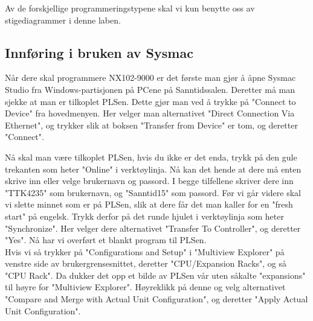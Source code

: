\begin{alphasection}
Av de forskjellige programmeringstypene skal vi kun benytte oss av stigediagrammer i denne laben.

\subsection{Innføring i bruken av Sysmac}
Når dere skal programmere NX102-9000 er det første man gjør å åpne Sysmac Studio fra Windows-partisjonen på PCene på Sanntidssalen. Deretter må man sjekke at man er tilkoplet PLSen. Dette gjør man ved å trykke på "Connect to Device" fra hovedmenyen. Her velger man alternativet "Direct Connection Via Ethernet", og trykker slik at boksen "Transfer from Device" er tom, og deretter "Connect".



Nå skal man være tilkoplet PLSen, hvis du ikke er det enda, trykk på den gule trekanten som heter "Online" i verktøylinja. Nå kan det hende at dere må enten skrive inn eller velge brukernavn og passord. I begge tilfellene skriver dere inn "TTK4235" som brukernavn, og "Sanntid15" som passord. Før vi går videre skal vi slette minnet som er på PLSen, slik at dere får det man kaller for en "fresh start" på engelsk. Trykk derfor på det runde hjulet i verktøylinja som heter "Synchronize". Her velger dere alternativet "Transfer To Controller", og deretter "Yes". Nå har vi overført et blankt program til PLSen.\\

Hvis vi så trykker på "Configurations and Setup" i "Multiview Explorer" på venstre side av brukergrensesnittet, deretter "CPU/Expansion Racks", og så "CPU Rack". Da dukker det opp et bilde av PLSen vår uten såkalte "expansions" til høyre for "Multiview Explorer". Høyreklikk på denne og velg alternativet "Compare and Merge with Actual Unit Configuration", og deretter "Apply Actual Unit Configuration".\\


\end{alphasection}
